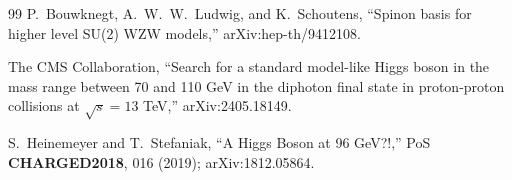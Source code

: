 \documentclass[aps,prd,onecolumn,superscriptaddress,nofootinbib,reprint]{revtex4-2}
\begin{document}
\begin{thebibliography}{99}
P.~Bouwknegt, A.~W.~W.~Ludwig, and K.~Schoutens, ``Spinon basis for
higher level SU(2) WZW models,'' arXiv:hep-th/9412108.

The CMS Collaboration, ``Search for a standard model-like Higgs boson in
the mass range between 70 and 110 GeV in the diphoton final state in
proton-proton collisions at $\sqrt{s}=13$ TeV,'' arXiv:2405.18149.

S.~Heinemeyer and T.~Stefaniak, ``A Higgs Boson at 96 GeV?!,'' PoS
\textbf{CHARGED2018}, 016 (2019); arXiv:1812.05864.

\end{thebibliography}
\end{document}

